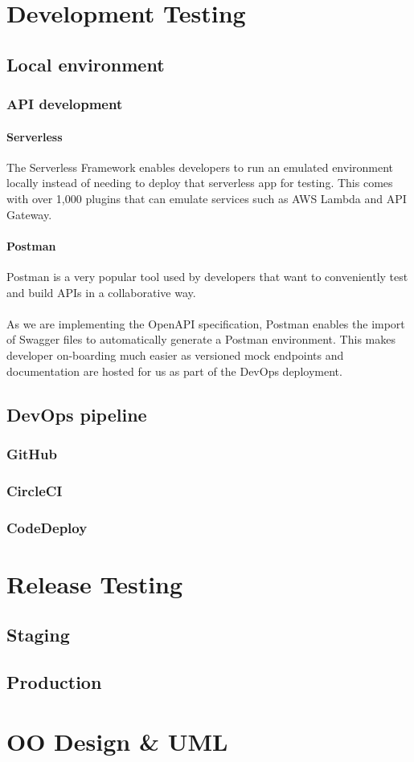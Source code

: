 \documentclass[10pt]{article}
\begin{document}
\section{Development Testing}
\subsection{Local environment}
\subsubsection{API development}
\paragraph{Serverless}
The Serverless Framework enables developers to run an emulated environment locally instead of needing to deploy that serverless app for testing. This comes with over 1,000 plugins that can emulate services such as AWS Lambda and API Gateway. 
\paragraph{Postman}

Postman is a very popular tool used by developers that want to conveniently test and build APIs in a collaborative way.
\\ \\
As we are implementing the OpenAPI specification, Postman enables the import of Swagger files to automatically generate a Postman environment. This makes developer on-boarding much easier as versioned mock endpoints and documentation are hosted for us as part of the DevOps deployment.


\subsection{DevOps pipeline}
\subsubsection{GitHub}
\subsubsection{CircleCI}
\subsubsection{CodeDeploy}

\section{Release Testing}
\subsection{Staging}
\subsection{Production}

\newpage
\section{OO Design \& UML}
\newpage

\printbibliography
\end{document}
